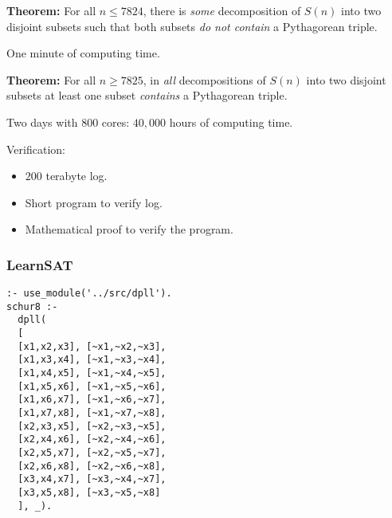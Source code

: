 \documentclass{beamer}
\begin{document}
\begin{frame}

\textbf{Theorem:}
For all $n\leq 7824$, there is \emph{some} decomposition of $S(n)$ into two disjoint subsets such that both subsets \emph{do not contain} a Pythagorean triple.

\pause

\bigskip

One minute of computing time.

\pause

\bigskip

\textbf{Theorem:}
For all $n\geq 7825$, in \emph{all} decompositions of $S(n)$ into two disjoint subsets at least one subset \emph{contains} a Pythagorean triple.

\pause

\bigskip

Two days with $800$ cores: $40,000$ hours of computing time.

\pause

\bigskip
Verification:
\begin{itemize}
\item $200$ terabyte log.
\item Short program to verify log.
\item Mathematical proof to verify the program.
\end{itemize}

\end{frame}


\begin{frame}[fragile]
\frametitle{LearnSAT}
\begin{verbatim}
:- use_module('../src/dpll').
schur8 :-
  dpll(
  [
  [x1,x2,x3], [~x1,~x2,~x3],
  [x1,x3,x4], [~x1,~x3,~x4],
  [x1,x4,x5], [~x1,~x4,~x5],
  [x1,x5,x6], [~x1,~x5,~x6],
  [x1,x6,x7], [~x1,~x6,~x7],
  [x1,x7,x8], [~x1,~x7,~x8],
  [x2,x3,x5], [~x2,~x3,~x5],
  [x2,x4,x6], [~x2,~x4,~x6],
  [x2,x5,x7], [~x2,~x5,~x7],
  [x2,x6,x8], [~x2,~x6,~x8],
  [x3,x4,x7], [~x3,~x4,~x7],
  [x3,x5,x8], [~x3,~x5,~x8]
  ], _).
\end{verbatim}
\end{frame}

\end{document}
